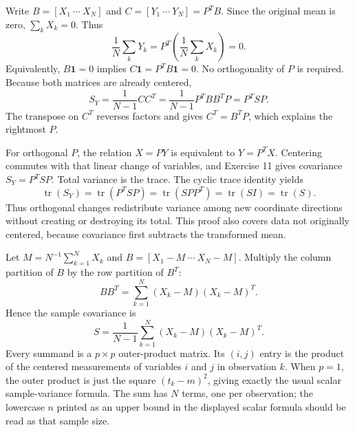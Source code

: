 Write $B=[X_1\ \cdots\ X_N]$ and $C=[Y_1\ \cdots\ Y_N]=P^TB$. Since the original mean is zero, $\sum_kX_k=0$. Thus
\[
\frac1N\sum_kY_k=P^T\left(\frac1N\sum_kX_k\right)=0.
\]
Equivalently, $B\mathbf1=0$ implies $C\mathbf1=P^TB\mathbf1=0$. No orthogonality of $P$ is required.
Because both matrices are already centered,
\[
S_Y=\frac1{N-1}CC^T
=\frac1{N-1}P^TBB^TP=P^TSP.
\]
The transpose on $C^T$ reverses factors and gives $C^T=B^TP$, which explains the rightmost $P$.

For orthogonal $P$, the relation $X=PY$ is equivalent to $Y=P^TX$. Centering commutes with that linear change of variables, and Exercise 11 gives covariance $S_Y=P^TSP$. Total variance is the trace. The cyclic trace identity yields
\[
\operatorname{tr}(S_Y)=\operatorname{tr}(P^TSP)
=\operatorname{tr}(SPP^T)=\operatorname{tr}(SI)=\operatorname{tr}(S).
\]
Thus orthogonal changes redistribute variance among new coordinate directions without creating or destroying its total. This proof also covers data not originally centered, because covariance first subtracts the transformed mean.

Let $M=N^{-1}\sum_{k=1}^NX_k$ and $B=[X_1-M\ \cdots\ X_N-M]$. Multiply the column partition of $B$ by the row partition of $B^T$:
\[
BB^T=\sum_{k=1}^N(X_k-M)(X_k-M)^T.
\]
Hence the sample covariance is
\[
\boxed{S=\frac1{N-1}\sum_{k=1}^N(X_k-M)(X_k-M)^T.}
\]
Every summand is a $p\times p$ outer-product matrix. Its $(i,j)$ entry is the product of the centered measurements of variables $i$ and $j$ in observation $k$. When $p=1$, the outer product is just the square $(t_k-m)^2$, giving exactly the usual scalar sample-variance formula. The sum has $N$ terms, one per observation; the lowercase $n$ printed as an upper bound in the displayed scalar formula should be read as that sample size.
